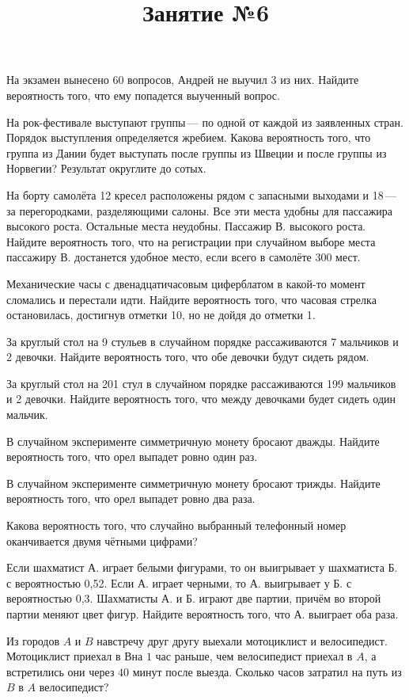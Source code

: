 \newpage
\title{Занятие №6}
\begin{listofex}
	\item На экзамен вынесено 60 вопросов, Андрей не выучил 3 из них. Найдите вероятность того, что ему попадется выученный вопрос.
	\item На рок-фестивале выступают группы — по одной от каждой из заявленных стран. Порядок выступления определяется жребием. Какова вероятность того, что группа из Дании будет выступать после группы из Швеции и после группы из Норвегии? Результат округлите до сотых.
	\item На борту самолёта 12 кресел расположены рядом с запасными выходами и 18 — за перегородками, разделяющими салоны. Все эти места удобны для пассажира высокого роста. Остальные места неудобны. Пассажир В. высокого роста. Найдите вероятность того, что на регистрации при случайном выборе места пассажиру В. достанется удобное место, если всего в самолёте 300 мест.
	\item Механические часы с двенадцатичасовым циферблатом в какой-то момент сломались и перестали идти. Найдите вероятность того, что часовая стрелка остановилась, достигнув отметки 10, но не дойдя до отметки 1.
	\item За круглый стол на 9 стульев в случайном порядке рассаживаются 7 мальчиков и 2 девочки. Найдите вероятность того, что обе девочки будут сидеть рядом.
	\item За круглый стол на 201 стул в случайном порядке рассаживаются 199 мальчиков и 2 девочки. Найдите вероятность того, что между девочками будет сидеть один мальчик.
	\item В случайном эксперименте симметричную монету бросают дважды. Найдите вероятность того, что орел выпадет ровно один раз.
	\item В случайном эксперименте симметричную монету бросают трижды. Найдите вероятность того, что орел выпадет ровно два раза.
	\item Какова вероятность того, что случайно выбранный телефонный номер оканчивается двумя чётными цифрами?
	\item Если шахматист А. играет белыми фигурами, то он выигрывает у шахматиста Б. с вероятностью 0,52. Если А. играет черными, то А. выигрывает у Б. с вероятностью 0,3. Шахматисты А. и Б. играют две партии, причём во второй партии меняют цвет фигур. Найдите вероятность того, что А. выиграет оба раза.
	\item Из городов \( A  \) и \( B  \) навстречу друг другу выехали мотоциклист и велосипедист. Мотоциклист приехал в \(В\)на \(1\) час раньше, чем велосипедист приехал в \( A \), а встретились они через \(40\) минут после выезда. Сколько часов затратил на путь из \(  B  \) в \( A  \) велосипедист?

\end{listofex}
